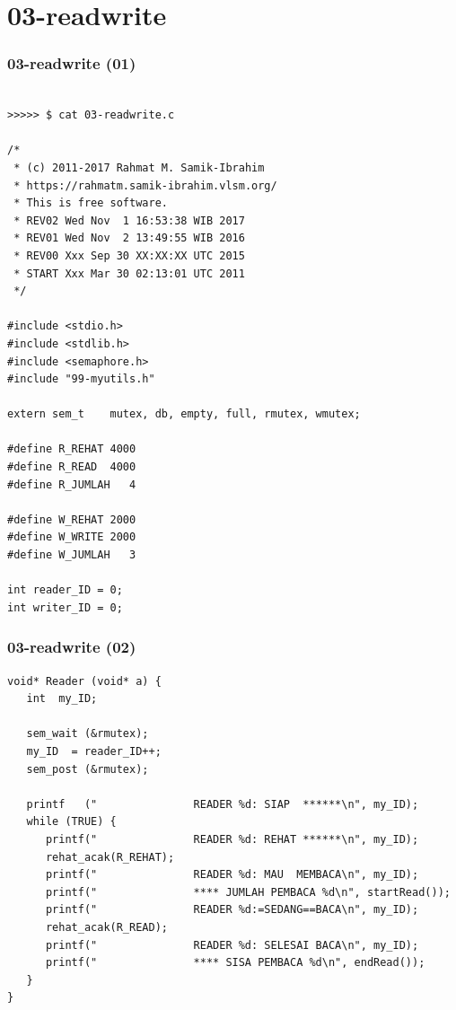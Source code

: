 \documentclass[xcolor=table, notheorems, hyperref={pdfpagelabels=false}]{beamer}
\begin{document}
\section{03-readwrite}
\begin{frame}[fragile]
\frametitle{03-readwrite (01)}
\begin{lstlisting}[basicstyle=\ttfamily\tiny]

>>>>> $ cat 03-readwrite.c

/*
 * (c) 2011-2017 Rahmat M. Samik-Ibrahim
 * https://rahmatm.samik-ibrahim.vlsm.org/
 * This is free software.
 * REV02 Wed Nov  1 16:53:38 WIB 2017
 * REV01 Wed Nov  2 13:49:55 WIB 2016
 * REV00 Xxx Sep 30 XX:XX:XX UTC 2015
 * START Xxx Mar 30 02:13:01 UTC 2011
 */

#include <stdio.h>
#include <stdlib.h>
#include <semaphore.h>
#include "99-myutils.h"

extern sem_t    mutex, db, empty, full, rmutex, wmutex;

#define R_REHAT 4000
#define R_READ  4000
#define R_JUMLAH   4

#define W_REHAT 2000
#define W_WRITE 2000
#define W_JUMLAH   3

int reader_ID = 0;
int writer_ID = 0;

\end{lstlisting}
\end{frame}

\begin{frame}[fragile]
\frametitle{03-readwrite (02)}
\begin{lstlisting}[basicstyle=\ttfamily\footnotesize]
void* Reader (void* a) {
   int  my_ID;

   sem_wait (&rmutex);
   my_ID  = reader_ID++;
   sem_post (&rmutex);

   printf   ("               READER %d: SIAP  ******\n", my_ID);
   while (TRUE) {
      printf("               READER %d: REHAT ******\n", my_ID);
      rehat_acak(R_REHAT);
      printf("               READER %d: MAU  MEMBACA\n", my_ID);
      printf("               **** JUMLAH PEMBACA %d\n", startRead());
      printf("               READER %d:=SEDANG==BACA\n", my_ID);
      rehat_acak(R_READ);
      printf("               READER %d: SELESAI BACA\n", my_ID);
      printf("               **** SISA PEMBACA %d\n", endRead());
   }
}

\end{lstlisting}
\end{frame}
\end{document}
